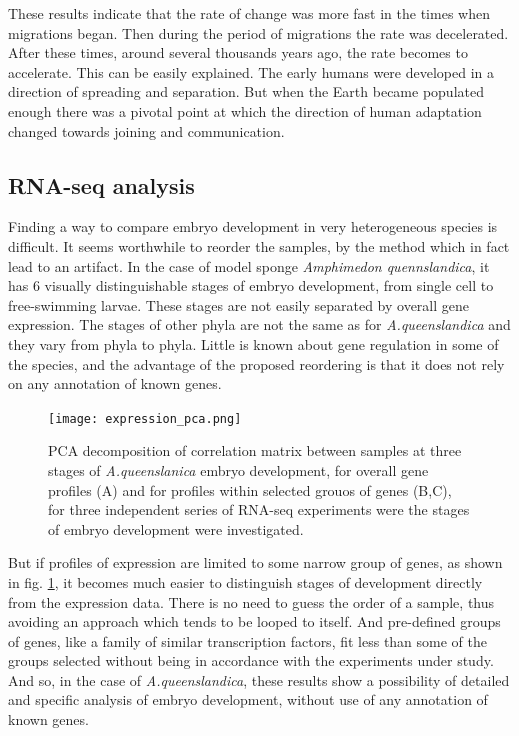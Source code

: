 \documentclass[12pt,aps]{revtex4}
\begin{document}
These results indicate that the rate of change was more fast in the times when migrations began.
Then during the period of migrations the rate was decelerated. After these times, around
several thousands years ago, the rate becomes to accelerate. This can be easily
explained. The early humans were developed in a direction of spreading and separation. But when
the Earth became populated enough there was a pivotal point at which the direction
of human adaptation changed towards joining and communication.

\subsection{RNA-seq analysis}

Finding a way to compare embryo development in very heterogeneous species is
difficult. It seems worthwhile to reorder the samples, by the method which in fact lead to an artifact. In the case of model sponge \textit{Amphimedon quennslandica}, it has 6 visually distinguishable
stages of embryo development, from single cell to free-swimming larvae. These stages
are not easily separated by overall gene expression. The stages of other phyla are
not the same as for \textit{A.queenslandica} and they vary from phyla to phyla. Little is
known about gene regulation in some of the species, and the advantage of the
proposed reordering is that it does not rely on any annotation of known genes.

\begin{figure}[h]
\centerline{\texttt{[image: expression\_pca.png]}}
\caption{PCA decomposition of correlation matrix between samples at three stages of \textit{A.queenslanica} embryo development, for overall gene profiles (A) and for profiles within selected grouos of genes (B,C), for three independent series of RNA-seq experiments were the stages of embryo development were investigated.}
\label{expression_pca}
\end{figure}

But if profiles of expression are limited to some narrow group of genes, as shown in
fig. \ref{expression_pca}, it becomes much easier to distinguish stages of development directly from the
expression data. There is no need to guess the order of a sample, thus avoiding an
approach which tends to be looped to itself.
And pre-defined groups of genes, like a family of similar transcription
factors, fit less than some of the groups selected without being in accordance
with the experiments under study.  And so, in the case of \textit{A.queenslandica}, these
results show a possibility of detailed and specific analysis of
embryo development, without use of any annotation of known genes.
\end{document}
